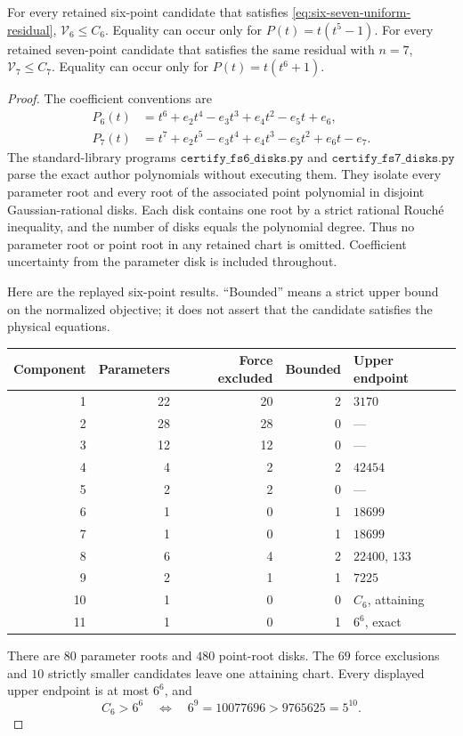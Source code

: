 \begin{proposition}
\label{prop:six-seven-retained-comparison}
For every retained six-point candidate that satisfies
\eqref{eq:six-seven-uniform-residual},
$\mathcal V_6\le C_6$. Equality can occur only for
$P(t)=t(t^5-1)$.
For every retained seven-point candidate that satisfies the same
residual with $n=7$, $\mathcal V_7\le C_7$. Equality can occur only
for $P(t)=t(t^6+1)$.
\end{proposition}
\begin{proof}
The coefficient conventions are
\[
 \begin{split}
 P_6(t)&=t^6+e_2t^4-e_3t^3+e_4t^2-e_5t+e_6,\\
 P_7(t)&=t^7+e_2t^5-e_3t^4+e_4t^3-e_5t^2+e_6t-e_7.
 \end{split}
\]
The standard-library programs
$\texttt{certify\_fs6\_disks.py}$ and
$\texttt{certify\_fs7\_disks.py}$ parse the exact author polynomials
without executing them. They isolate every parameter root and every
root of the associated point polynomial in disjoint Gaussian-rational
disks. Each disk contains one root by a strict rational Rouch\'e
inequality, and the number of disks equals the polynomial degree.
Thus no parameter root or point root in any retained chart is omitted.
Coefficient uncertainty from the parameter disk is included throughout.

Here are the replayed six-point results. ``Bounded'' means a strict
upper bound on the normalized objective; it does not assert that the
candidate satisfies the physical equations.
\begin{center}
\begin{tabular}{rrrrl}
\toprule
Component&Parameters&Force excluded&Bounded&Upper endpoint\\
\midrule
1&22&20&2&$3170$\\
2&28&28&0&---\\
3&12&12&0&---\\
4&4&2&2&$42454$\\
5&2&2&0&---\\
6&1&0&1&$18699$\\
7&1&0&1&$18699$\\
8&6&4&2&$22400$, $133$\\
9&2&1&1&$7225$\\
10&1&0&0&$C_6$, attaining\\
11&1&0&1&$6^6$, exact\\
\bottomrule
\end{tabular}
\end{center}
There are $80$ parameter roots and $480$ point-root disks.
The $69$ force exclusions and $10$ strictly smaller candidates leave
one attaining chart. Every displayed upper endpoint is at most $6^6$,
and
\[
 C_6>6^6\quad\Longleftrightarrow\quad
 6^9=10077696>9765625=5^{10}.
\]


\end{proof}
